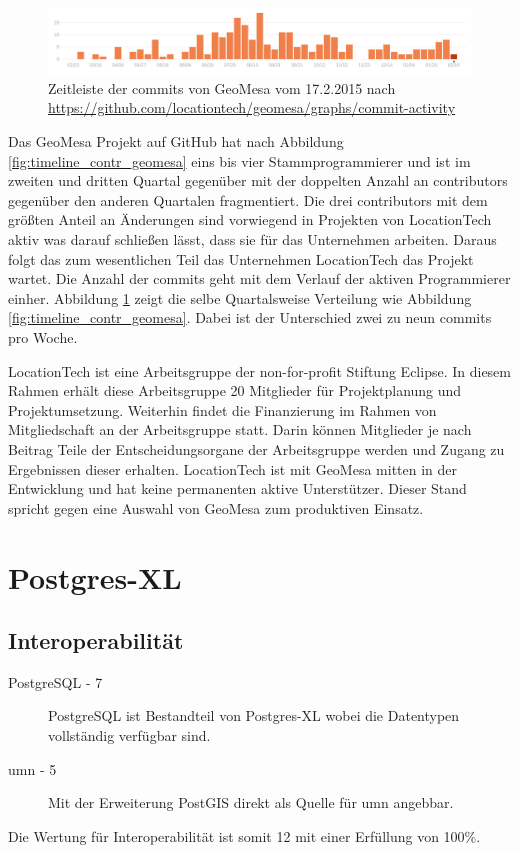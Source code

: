 \begin{figure}[h!]
\centering
\includegraphics[width=\textwidth]{Abbildungen/geomesa_timeline_commits.png}
\caption[Zeitleiste der commits von GeoMesa]{Zeitleiste der commits von GeoMesa vom 17.2.2015 nach \url{https://github.com/locationtech/geomesa/graphs/commit-activity}}
\label{fig:timeline_commits_geomesa}
\end{figure}
Das GeoMesa Projekt auf GitHub hat nach Abbildung \ref{fig:timeline_contr_geomesa} eins bis vier Stammprogrammierer und ist im zweiten und dritten Quartal gegenüber mit der doppelten Anzahl an contributors gegenüber den anderen Quartalen fragmentiert.
Die drei contributors mit dem größten Anteil an Änderungen sind vorwiegend in Projekten von LocationTech aktiv was darauf schließen lässt, dass sie für das Unternehmen arbeiten.
Daraus folgt das zum wesentlichen Teil das Unternehmen LocationTech das Projekt wartet.
Die Anzahl der commits geht mit dem Verlauf der aktiven Programmierer einher.
Abbildung \ref{fig:timeline_commits_geomesa} zeigt die selbe Quartalsweise Verteilung wie Abbildung \ref{fig:timeline_contr_geomesa}.
Dabei ist der Unterschied zwei zu neun commits pro Woche.

LocationTech ist eine Arbeitsgruppe der non-for-profit Stiftung Eclipse.
In diesem Rahmen erhält diese Arbeitsgruppe 20 Mitglieder für Projektplanung und Projektumsetzung.
Weiterhin findet die Finanzierung im Rahmen von Mitgliedschaft an der Arbeitsgruppe statt.
Darin können Mitglieder je nach Beitrag Teile der Entscheidungsorgane der Arbeitsgruppe werden und Zugang zu Ergebnissen dieser erhalten. \cite{website:locationtech-about}
LocationTech ist mit GeoMesa mitten in der Entwicklung und hat keine permanenten aktive Unterstützer.
Dieser Stand spricht gegen eine Auswahl von GeoMesa zum produktiven Einsatz.

\section{Postgres-XL}
\label{gegenuerbestellung:postgresxl}

\subsection{Interoperabilität}
\begin{description}
\item[PostgreSQL - 7] PostgreSQL ist Bestandteil von Postgres-XL wobei die Datentypen vollständig verfügbar sind.
\item[\Gls{umn} - 5] Mit der Erweiterung PostGIS direkt als Quelle für \Gls{umn} angebbar. \cite{website:umn-layer}
\end{description}
Die Wertung für Interoperabilität ist somit 12 mit einer Erfüllung von 100\%.

